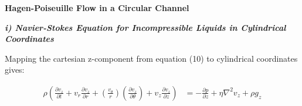 \documentclass[titlepage]{article}
\begin{document}
    \newpage
    \begin{center}
        \large
        \textbf{Hagen-Poiseuille Flow in a Circular Channel} \\
    \end{center}

    \normalsize
    \begin{center}
        \textbf{\emph{i) Navier-Stokes Equation for Incompressible Liquids in Cylindrical Coordinates}}
    \end{center}

    \noindent Mapping the cartesian z-component from equation (10) to cylindrical coordinates gives: 

    \begin{align}
        \rho\left(\displaystyle\frac{\partial{v_{z}}}{\partial{t}}+v_{r}\displaystyle\frac{\partial{v_{z}}}{\partial{r}}+\left(\displaystyle\frac{v_{\theta}}{r}\right)\left(\displaystyle\frac{\partial{v_{z}}}{\partial{\theta}}\right)+v_{z}\displaystyle\frac{\partial{v_{z}}}{\partial{z}}\right)&=-\displaystyle\frac{\partial{p}}{\partial{z}}+\eta\nabla^2v_{z}+\rho{g_{z}}
    \end{align}
\end{document}
